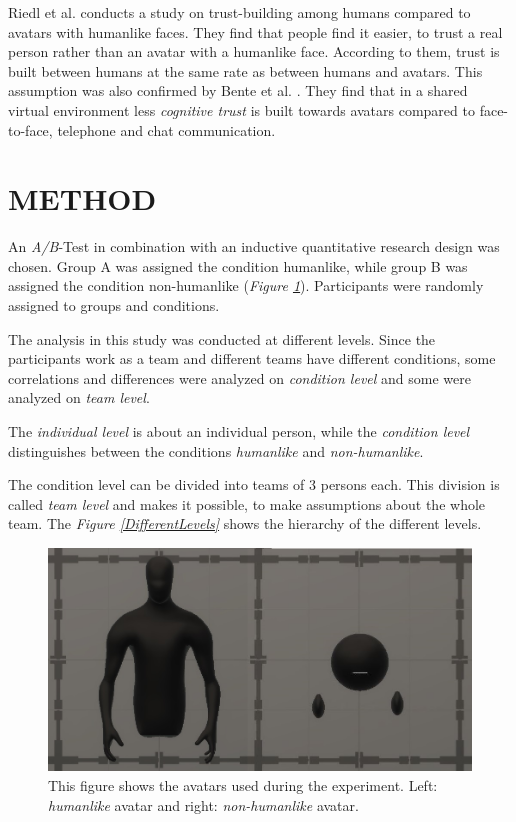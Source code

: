 \documentclass[sigchi]{acmart}
\begin{document}
Riedl et al. \citep{riedl2014trusting} conducts a study on trust-building among humans compared to avatars with humanlike faces. They find that people find it easier, to trust a real person rather than an avatar with a humanlike face. According to them, trust is built between humans at the same rate as between humans and avatars.
This assumption was also confirmed by Bente et al. \citep{bente2004social}. They find that in a shared virtual environment less \textit{cognitive trust} is built towards avatars compared to face-to-face, telephone and chat communication.

\section{METHOD}
An \textit{A/B}-Test in combination with an inductive quantitative research design was chosen.
Group A was assigned the condition humanlike, while group B was assigned the condition non-humanlike (\textit{Figure \ref{Avatars}}). Participants were randomly assigned to groups and conditions. 

The analysis in this study was conducted at different levels.
Since the participants work as a team and different teams have different conditions, some correlations and differences were analyzed on \textit{condition level} and some were analyzed on \textit{team level}.

The \textit{individual level} is about an individual person, while the \textit{condition level} distinguishes between the conditions \textit{humanlike} and \textit{non-humanlike}.

The condition level can be divided into teams of 3 persons each. This division is called \textit{team level} and makes it possible, to make assumptions about the whole team. 
The \textit{Figure \ref{DifferentLevels}} shows the hierarchy of the different levels.

\begin{figure}[h]
  \centering
 		\includegraphics[width=0.60\linewidth]{Abbildungen/Avatars.JPG}
			\caption[The avatars]{This figure shows the avatars used during the experiment. Left: \textit{humanlike} avatar and right: \textit{non-humanlike} avatar.}
			\label{Avatars}
\end{figure}	
\end{document}
